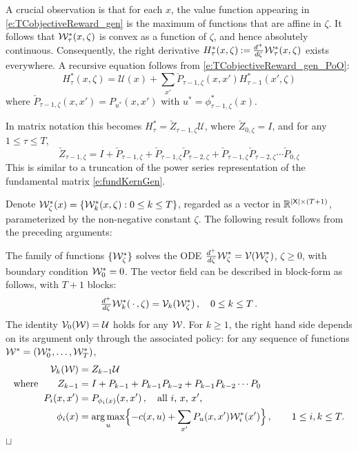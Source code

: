 \documentclass[final,12pt]{colt2018} %
\def\util{{\mathcal{U}}}
\def\sq{\hbox{\rlap{$\sqcap$}$\sqcup$}}
\def\argmax{\mathop{\rm arg\, max}}
\def\state{{\sf X}}
\newcommand{\field}[1]{\mathbb{#1}}
\def\Re{\field{R}}
\def\cP{{\check{P}}}
\def\cZ{{\check{Z}}}
\def\clV{{\cal V}}
\def\clW{{\cal W}}
\def\FRAC#1#2#3{\genfrac{}{}{}{#1}{#2}{#3}}
\def\ddzetap{{\mathchoice{\FRAC{1}{d^+}{d\zeta}}%
{\FRAC{1}{d^+}{d\zeta}}%
{\FRAC{3}{d^+}{d\zeta}}%
{\FRAC{3}{d^+}{d\zeta}}}}
\def\eqdef{\mathbin{:=}}
\def\varble{\,\cdot\,}
\def\Re{\field{R}}
\begin{document}
A crucial observation is that for each $x$, the value function appearing in \eqref{e:TCobjectiveReward_gen} is the maximum
of functions that are affine in $\zeta$.  It follows that $\clW^*_\tau(x,\zeta) $ is convex as a function of $\zeta$, and hence absolutely continuous.  Consequently, the right derivative   $H^*_\tau(x,\zeta) \eqdef \ddzetap  \clW^*_\tau(x,\zeta) $ exists everywhere.  A recursive equation follows from 
\eqref{e:TCobjectiveReward_gen_PoO}:
\begin{equation}
H^*_\tau(x,\zeta) = \util(x)       + \sum_{x'} \cP_{\tau-1,\zeta}(x,x') H^*_{\tau-1} (x',\zeta)  
\label{e:TCobjectiveReward_ODEa}
\end{equation}  
where $\cP_{\tau-1,\zeta}(x,x') = P_{u^*}(x,x')$ with $u^* =  \phi^*_{\tau-1,\zeta}(x)$.   

In matrix notation this becomes $H^*_\tau =  \cZ_{\tau-1,\zeta} \util$, where
 $\cZ_{0,\zeta} =I$, and
 for any $1\le \tau\le T$,
\begin{equation}
\cZ_{\tau-1,\zeta} = I +  \cP_{\tau-1,\zeta}+\cP_{\tau-1,\zeta}\cP_{\tau-2,\zeta}
			+ \cP_{\tau-1,\zeta}\cP_{\tau-2,\zeta} \cdots \cP_{0,\zeta}
\label{e:fund_matrix_finite}
\end{equation}
 This is similar to a truncation of the  power series representation of the fundamental matrix \eqref{e:fundKernGen}.

Denote $\clW^*_\zeta(x) =\{ \clW^*_k(x,\zeta)  : 0\le k\le T\}$, regarded as a vector in $\Re^{|\state|\times(T+1)}$, parameterized by the non-negative constant $\zeta$.  The following result follows from the preceding arguments: 
\begin{theorem}
\label{t:TCODE}  
The family of functions $\{\clW^*_\zeta\}$ solves the ODE
$\displaystyle 
\ddzetap \clW^*_\zeta =\clV( \clW^*_\zeta )$,  $ \zeta\ge 0$,  
with boundary condition $\clW^*_0 = 0$.   The vector field can be described in block-form as follows, with $T+1$ blocks:
\[
\ddzetap \clW^*_k(\varble,\zeta)  =\clV_k( \clW^*_\zeta )\,,\quad 0\le k\le T\, .
\]
The identity $\clV_0(\clW) = \util$ holds for any $\clW$.
For $k\ge 1$, the right hand side depends on  its argument only through the associated policy:  for any sequence of functions $\clW^* =(\clW^*_0,\dots,\clW^*_T)$,
\[
\begin{aligned}
\clV_k(\clW)  &=  Z_{k-1} \util 
\\
\text{where} \qquad
  Z_{k-1} &= 
 I +  P_{k-1}+P_{k-1}P_{k-2}
			+ P_{k-1}P_{k-2}  \cdots P_0 	 
			\\
			P_i(x,x') &= 	P_{\phi_{i}(x)} (x,x')\,, \quad \text{all $i$, $x$, $x'$,} 
\\
\phi_i(x)  &=  \argmax_u   \Bigl\{  -  c(x,u)     + \sum_{x'} P_u(x,x') \clW^*_i (x')  \Bigr\}   \,, \qquad 1\le i, k\le T.
\end{aligned}
\]\hfill \sq
\end{theorem}
\end{document}
